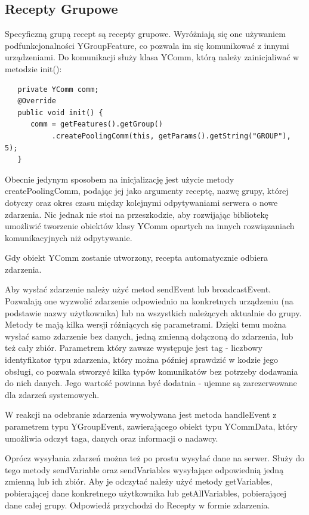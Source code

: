 \documentclass[11pt,a4paper,polish,thesis]{dcsbook}
\begin{document}
\subsection{Recepty Grupowe}
Specyficzną grupą recept są recepty grupowe. Wyróżniają się one używaniem podfunkcjonalności YGroupFeature, co pozwala im się komunikować z innymi urządzeniami.
Do komunikacji służy klasa YComm, którą należy zainicjaliwać w metodzie init():
\begin{verbatim}
   private YComm comm;
   @Override
   public void init() {
      comm = getFeatures().getGroup()
           .createPoolingComm(this, getParams().getString("GROUP"), 5);
   }
\end{verbatim}
Obecnie jedynym sposobem na inicjalizację jest użycie metody createPoolingComm, podając jej jako argumenty  receptę, nazwę grupy, której dotyczy oraz okres czasu między kolejnymi odpytywaniami serwera o nowe zdarzenia. Nic jednak nie stoi na przeszkodzie, aby rozwijając bibliotekę umożliwić tworzenie obiektów klasy YComm opartych na innych rozwiązaniach komunikacyjnych niż odpytywanie. 

Gdy obiekt YComm zostanie utworzony, recepta automatycznie odbiera zdarzenia.

Aby wysłać zdarzenie należy użyć metod sendEvent lub broadcastEvent. Pozwalają one wyzwolić zdarzenie odpowiednio na konkretnych urządzeniu (na podstawie nazwy użytkownika) lub na wszystkich należących aktualnie do grupy. Metody te mają kilka wersji różniących się parametrami. Dzięki temu można wysłać samo zdarzenie bez danych, jedną zmienną dołączoną do zdarzenia, lub też cały zbiór. Parametrem który zawsze występuje jest tag - liczbowy identyfikator typu zdarzenia, który można później sprawdzić w kodzie jego obsługi, co pozwala stworzyć kilka typów komunikatów bez potrzeby dodawania do nich danych. Jego wartość powinna być dodatnia - ujemne są zarezerwowane dla zdarzeń systemowych.

W reakcji na odebranie zdarzenia wywoływana jest metoda handleEvent z parametrem typu YGroupEvent,  zawierającego obiekt typu YCommData, który umożliwia odczyt taga, danych oraz informacji o nadawcy.

Oprócz wysyłania zdarzeń można też po prostu wysyłać dane na serwer. Służy do tego metody sendVariable oraz sendVariables wysyłające odpowiednią jedną zmienną lub ich zbiór. Aby je odczytać należy użyć metody getVariables, pobierającej dane konkretnego użytkownika lub getAllVariables, pobierającej dane całej grupy. Odpowiedź przychodzi do Recepty w formie zdarzenia.
\end{document}
